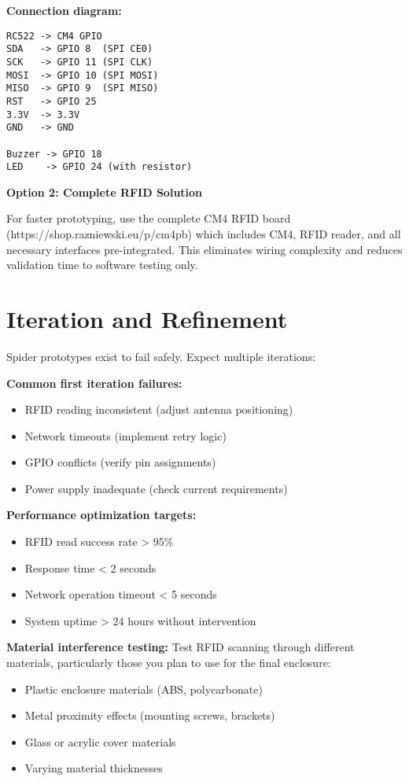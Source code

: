 \textbf{Connection diagram:}
\begin{verbatim}
RC522 -> CM4 GPIO
SDA   -> GPIO 8  (SPI CE0)
SCK   -> GPIO 11 (SPI CLK)
MOSI  -> GPIO 10 (SPI MOSI)
MISO  -> GPIO 9  (SPI MISO)
RST   -> GPIO 25
3.3V  -> 3.3V
GND   -> GND

Buzzer -> GPIO 18
LED    -> GPIO 24 (with resistor)
\end{verbatim}

\textbf{Option 2: Complete RFID Solution}

For faster prototyping, use the complete CM4 RFID board (https://shop.razniewski.eu/p/cm4pb) which includes CM4, RFID reader, and all necessary interfaces pre-integrated. This eliminates wiring complexity and reduces validation time to software testing only.

\section{Iteration and Refinement}

Spider prototypes exist to fail safely. Expect multiple iterations:

\textbf{Common first iteration failures:}
\begin{itemize}
\item RFID reading inconsistent (adjust antenna positioning)
\item Network timeouts (implement retry logic)
\item GPIO conflicts (verify pin assignments)
\item Power supply inadequate (check current requirements)
\end{itemize}

\textbf{Performance optimization targets:}
\begin{itemize}
\item RFID read success rate > 95\%
\item Response time < 2 seconds
\item Network operation timeout < 5 seconds
\item System uptime > 24 hours without intervention
\end{itemize}

\textbf{Material interference testing:}
Test RFID scanning through different materials, particularly those you plan to use for the final enclosure:
\begin{itemize}
\item Plastic enclosure materials (ABS, polycarbonate)
\item Metal proximity effects (mounting screws, brackets)
\item Glass or acrylic cover materials
\item Varying material thicknesses
\end{itemize}

